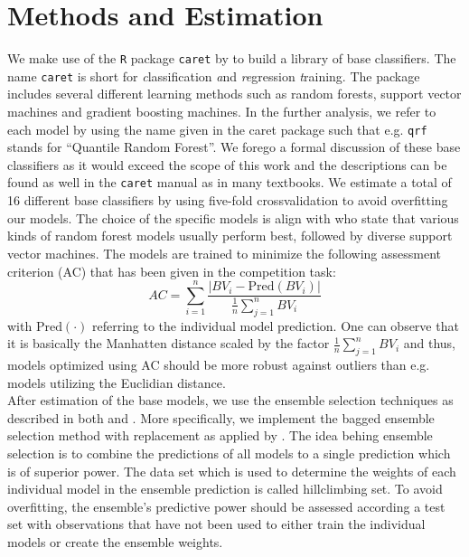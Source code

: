 \documentclass[12pt]{article}
\begin{document}
\section{Methods and Estimation}
\label{sect:meth}
We make use of the \texttt{R} package \texttt{caret} by \cite{caret} to build a library of base classifiers. The name \texttt{caret} is short for \textit{c}lassification \textit{a}nd \textit{re}gression \textit{t}raining. The package includes several different learning methods such as random forests, support vector machines and gradient boosting machines. In the further analysis, we refer to each model by using the name given in the caret package such that e.g. \texttt{qrf} stands for ``Quantile Random Forest''. 
We forego a formal discussion of these base classifiers as it would exceed the scope of this work and the descriptions can be found as well in the \texttt{caret} manual as in many textbooks. We estimate a total of 16 different base classifiers by using five-fold crossvalidation to avoid overfitting our models.
The choice of the specific models is align with \cite{Fernandez-Delgado2014} who state that various kinds of random forest models usually perform best, followed by diverse support vector machines.
The models are trained to minimize the following assessment criterion (AC) that has been given in the competition task:
\begin{equation}
AC = \sum_{i=1}^n \frac{|BV_{i} - \mbox{Pred}(BV_{i})|}{\frac{1}{n} \sum_{j=1}^n BV_{i}}
\end{equation}
with $\mbox{Pred}(\cdot)$ referring to the individual model prediction. One can observe that it is basically the Manhatten distance scaled by the factor  $\frac{1}{n} \sum_{j=1}^n BV_{i}$ and thus, models optimized using AC should be more robust against outliers than e.g. models utilizing the Euclidian distance. \\

After estimation of the base models, we use the ensemble selection techniques as described in both \cite{Caruana2006} and \cite{Caruana04}. More specifically, we implement the bagged ensemble selection method with replacement as applied by \cite{Caruana04}. The idea behing ensemble selection is to combine the predictions of all models to a single prediction which is of superior power. The data set which is used to determine the weights of each individual model in the ensemble prediction is called hillclimbing set. To avoid overfitting, the ensemble's predictive power should be assessed according a test set with observations that have not been used to either train the individual models or create the ensemble weights.\\
\end{document}
